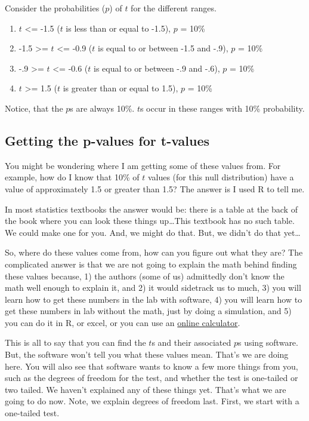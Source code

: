 \documentclass[
]{book}
\providecommand{\tightlist}{%
  \setlength{\itemsep}{0pt}\setlength{\parskip}{0pt}}
\begin{document}
Consider the probabilities (\(p\)) of \(t\) for the different ranges.

\begin{enumerate}
\def\labelenumi{\arabic{enumi}.}
\tightlist
\item
  \(t\) \textless= -1.5 (\(t\) is less than or equal to -1.5), \(p\) = 10\%
\item
  -1.5 \textgreater= \(t\) \textless= -0.9 (\(t\) is equal to or between -1.5 and -.9), \(p\) = 10\%
\item
  -.9 \textgreater= \(t\) \textless= -0.6 (\(t\) is equal to or between -.9 and -.6), \(p\) = 10\%
\item
  \(t\) \textgreater= 1.5 (\(t\) is greater than or equal to 1.5), \(p\) = 10\%
\end{enumerate}

Notice, that the \(p\)s are always 10\%. \(t\)s occur in these ranges with 10\% probability.

\hypertarget{getting-the-p-values-for-t-values}{%
\subsection{Getting the p-values for t-values}\label{getting-the-p-values-for-t-values}}

You might be wondering where I am getting some of these values from. For example, how do I know that 10\% of \(t\) values (for this null distribution) have a value of approximately 1.5 or greater than 1.5? The answer is I used R to tell me.

In most statistics textbooks the answer would be: there is a table at the back of the book where you can look these things up\ldots This textbook has no such table. We could make one for you. And, we might do that. But, we didn't do that yet\ldots{}

So, where do these values come from, how can you figure out what they are? The complicated answer is that we are not going to explain the math behind finding these values because, 1) the authors (some of us) admittedly don't know the math well enough to explain it, and 2) it would sidetrack us to much, 3) you will learn how to get these numbers in the lab with software, 4) you will learn how to get these numbers in lab without the math, just by doing a simulation, and 5) you can do it in R, or excel, or you can use an \href{http://www.socscistatistics.com/pvalues/tdistribution.aspx}{online calculator}.

This is all to say that you can find the \(t\)s and their associated \(p\)s using software. But, the software won't tell you what these values mean. That's we are doing here. You will also see that software wants to know a few more things from you, such as the degrees of freedom for the test, and whether the test is one-tailed or two tailed. We haven't explained any of these things yet. That's what we are going to do now. Note, we explain degrees of freedom last. First, we start with a one-tailed test.
\end{document}
